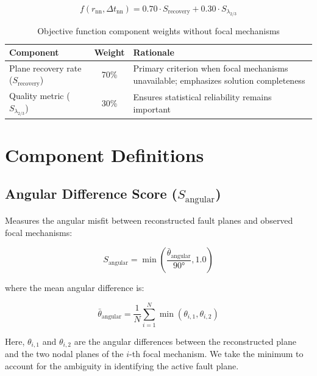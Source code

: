 \documentclass[11pt,a4paper]{article}
\begin{document}
\begin{equation}
\label{eq:objective_no_focal}
f(r_{\text{nn}}, \Delta t_{\text{nn}}) = 0.70 \cdot S_{\text{recovery}} + 0.30 \cdot S_{\lambda_{2/3}}
\end{equation}

\begin{table}[h]
\centering
\caption{Objective function component weights without focal mechanisms}
\label{tab:weights_no_focal}
\begin{tabular}{lcp{7cm}}
\toprule
\textbf{Component} & \textbf{Weight} & \textbf{Rationale} \\
\midrule
Plane recovery rate ($S_{\text{recovery}}$) & 70\% & Primary criterion when focal mechanisms unavailable; emphasizes solution completeness \\
Quality metric ($S_{\lambda_{2/3}}$) & 30\% & Ensures statistical reliability remains important \\
\bottomrule
\end{tabular}
\end{table}

\section{Component Definitions}

\subsection{Angular Difference Score ($S_{\text{angular}}$)}

Measures the angular misfit between reconstructed fault planes and observed focal mechanisms:

\begin{equation}
\label{eq:angular_score}
S_{\text{angular}} = \min\left(\frac{\bar{\theta}_{\text{angular}}}{90°}, 1.0\right)
\end{equation}

where the mean angular difference is:

\begin{equation}
\label{eq:mean_angular}
\bar{\theta}_{\text{angular}} = \frac{1}{N} \sum_{i=1}^{N} \min(\theta_{i,1}, \theta_{i,2})
\end{equation}

Here, $\theta_{i,1}$ and $\theta_{i,2}$ are the angular differences between the reconstructed plane and the two nodal planes of the $i$-th focal mechanism. We take the minimum to account for the ambiguity in identifying the active fault plane.
\end{document}
